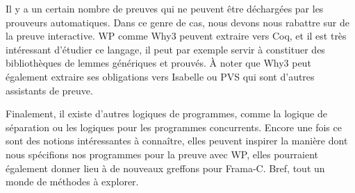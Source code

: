 Il y a un certain nombre de preuves qui ne peuvent être déchargées par les 
prouveurs automatiques. Dans ce genre de cas, nous devons nous rabattre sur de la 
preuve interactive. WP comme Why3 peuvent extraire vers Coq, et il est très
intéressant d'étudier ce langage, il peut par exemple servir à constituer des 
bibliothèques de lemmes génériques et prouvés. À noter que Why3 peut également
extraire ses obligations vers Isabelle ou PVS qui sont d'autres assistants de
preuve.



Finalement, il existe d'autres logiques de programmes, comme la logique de 
séparation ou les logiques pour les programmes concurrents. Encore une fois ce
sont des notions intéressantes à connaître, elles peuvent inspirer la manière dont
nous spécifions nos programmes pour la preuve avec WP, elles pourraient également
donner lieu à de nouveaux greffons pour Frama-C. Bref, tout un monde de méthodes à
explorer.
